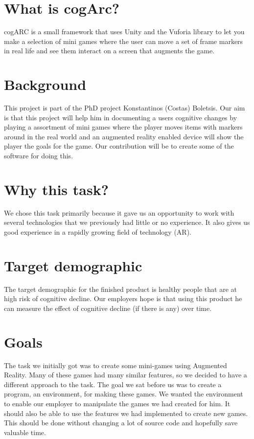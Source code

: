 \section{What is cogArc?}
cogARC is a small framework that uses Unity and the Vuforia library to let you make a selection of mini games where the user can move a set of frame markers in real life and see them interact on a screen that augments the game.

\section{Background}
This project is part of the PhD project Konstantinos (Costas) Boletsis. Our aim is that this project will help him in documenting a users cognitive changes by playing a assortment of mini games where the player moves items with markers around in the real world and an augmented reality enabled device will show the player the goals for the game. Our contribution will be to create some of the software for doing this.

\section{Why this task?}
We chose this task primarily because it gave us an opportunity to work with several technologies that we previously had little or no experience.
It also gives us good experience in a rapidly growing field of technology (AR).

\section{Target demographic}
The target demographic for the finished product is healthy people that are at high risk of cognitive decline.
Our employers hope is that using this product he can measure the effect of cognitive decline (if there is any) over time.

\section{Goals}
The task we initially got was to create some mini-games using \gls{Augmented Reality}. Many of these games had many similar features, so we decided to have a different approach to the task. The goal we sat before us was to create a program, an environment, for making these games. We wanted the environment to enable our employer to manipulate the games we had created for him. It should also be able to use the features we had implemented to create new games. This should be done without changing a lot of source code and hopefully save valuable time.

